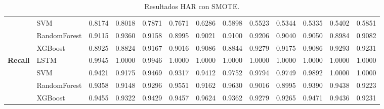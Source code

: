 \begin{table}[h]
\begin{adjustbox}{max width=15cm}
\begin{tabular}{|c|l|r|r|r|r|r|r|r|r|r|r|r|}
			& SVM &  0.8174 &  0.8018 &  0.7871 &  0.7671 &  0.6286 &  0.5898 &  0.5523 &  0.5344 &  0.5335 &  0.5402 &  0.5851 \\
			& RandomForest &  0.9115 &  0.9360 &  0.9158 &  0.8995 &  0.9021 &  0.9100 &  0.9206 &  0.9040 &  0.9050 &  0.8984 &  0.9082 \\
			& XGBoost &  0.8925 &  0.8824 &  0.9167 &  0.9016 &  0.9086 &  0.8844 &  0.9279 &  0.9175 &  0.9086 &  0.9293 &  0.9231 \\
			\hline
			\textbf{Recall} & LSTM &  0.9945 &  1.0000 &  0.9946 &  1.0000 &  1.0000 &  1.0000 &  1.0000 &  1.0000 &  1.0000 &  1.0000 &  1.0000 \\
			& SVM &  0.9421 &  0.9175 &  0.9469 &  0.9317 &  0.9412 &  0.9752 &  0.9794 &  0.9749 &  0.9892 &  1.0000 &  1.0000 \\
			& RandomForest &  0.9358 &  0.9148 &  0.9296 &  0.9551 &  0.9162 &  0.9630 &  0.9016 &  0.8995 &  0.9390 &  0.9438 &  0.9223 \\
			& XGBoost &  0.9455 &  0.9322 &  0.9429 &  0.9457 &  0.9624 &  0.9362 &  0.9279 &  0.9265 &  0.9471 &  0.9436 &  0.9231 \\
			\hline
		\end{tabular}
	\end{adjustbox}
	\caption{Resultados HAR con SMOTE.}
	\label{tab:HAR_SMOTE}
\end{table}

